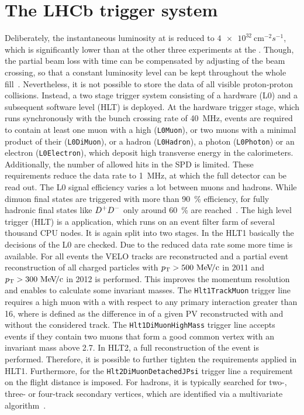 
\section{The LHCb trigger system}
\label{sec:detector:trigger}

Deliberately, the instantaneous luminosity at \lhcb is reduced to
$\SI{4e32}{\cm^{-2}s^{-1}}$, which is significantly lower than at the other
three experiments at the \lhc. Though, the partial beam loss with time can be
compensated by adjusting of the beam crossing, so that a constant luminosity
level can be kept throughout the whole fill~\cite{Alemany-Fernandez:2013bya}.
Nevertheless, it is not possible to store the data of all visible
proton-proton collisions. Instead, a two stage trigger system consisting of a
hardware (L0) and a subsequent software level (HLT) is deployed. At the
hardware trigger stage, which runs synchronously with the bunch crossing rate
of \SI{40}{\mega\hertz}, events are required to contain at least one muon with
a high \pt (\texttt{L0Muon}), or two muons with a minimal product of their \pT
(\texttt{L0DiMuon}), or a hadron (\texttt{L0Hadron}), a photon
(\texttt{L0Photon}) or an electron (\texttt{L0Electron}), which deposit high
transverse energy in the calorimeters. Additionally, the number of allowed
hits in the SPD is limited. These requirements reduce the data rate to
\SI{1}{\mega\hertz}, at which the full detector can be read out. The L0 signal
efficiency varies a lot between muons and hadrons. While dimuon final states
are triggered with more than \SI{90}{\percent} efficiency, for fully hadronic
final states like ${{D}^+}{{D}^-}$ only around \SI{60}{\percent} are
reached~\cite{LHCb-DP-2012-004,TriggerPerformance2012}. The high level trigger
(HLT) is a \cpp application, which runs on an event filter farm of several
thousand CPU nodes. It is again split into two stages. In the HLT1 basically
the decisions of the L0 are checked. Due to the reduced data rate some more
time is available. For all events the VELO tracks are reconstructed and a
partial event reconstruction of all charged particles with $\mbox{$p_{\mathrm{ T}}$} >
\SI{500}{\ensuremath{{\mathrm{\,Me\kern -0.1em V\!/}c}}}$ in 2011 and $\mbox{$p_{\mathrm{ T}}$} > \SI{300}{\ensuremath{{\mathrm{\,Me\kern -0.1em V\!/}c}}}$ in 2012 is performed.
This improves the momentum resolution and enables to calculate some invariant
masses. The \texttt{Hlt1TrackMuon} trigger line requires a high \pt muon with
a \chisqip with respect to any primary interaction greater than 16, where
\chisqip is defined as the difference in \chisq of a given PV reconstructed
with and without the considered track. The \texttt{Hlt1DiMuonHighMass} trigger
line accepts events if they contain two muons that form a good common vertex
with an invariant mass above \SI{2.7}{\gevcc}. In HLT2, a full reconstruction
of the event is performed. Therefore, it is possible to further tighten the
requirements applied in HLT1. Furthermore, for the
\texttt{Hlt2DiMuonDetachedJPsi} trigger line a requirement on the flight
distance is imposed. For hadrons, it is typically searched for two-, three- or
four-track secondary vertices, which are identified via a multivariate
algorithm~\cite{BBDT}.

